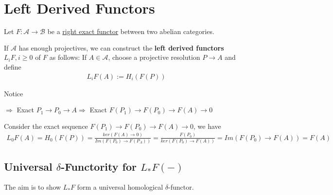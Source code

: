\documentclass[Total.tex]{subfiles}
\begin{document}
		\section{Left Derived Functors}
			\begin{Def}
				Let $F:\mathcal{A}\rightarrow \mathcal{B}$ be a \underline{right exact functor} between two abelian categories. 
				
				
				If $\mathcal{A}$ has enough projectives, we can construct the \textbf{left derived functors} $L_iF,i\geq 0$ of $F$ as follows: If $A\in \mathcal{A}$, choose a projective resolution $P\rightarrow A$ and define
				\begin{gather*}
					L_iF(A):=H_i(F(P))
				\end{gather*}
			\end{Def}
			
			Notice
			
			\begin{center}
				$\Rightarrow$ Exact $ P_1\rightarrow P_0\rightarrow A\Rightarrow$ Exact $ F(P_1)\rightarrow F(P_0)\rightarrow F(A)\rightarrow 0$
			\end{center}
			
			Consider the exact sequence $F(P_1)\rightarrow F(P_0)\rightarrow F(A)\rightarrow 0$, we have
			\begin{gather*}
				L_0F(A)=H_0(F(P))=\frac{ker(F(A)\rightarrow 0)}{Im(F(P_0)\rightarrow F(P_A))}=\frac{F(P_0)}{ker(F(P_0)\rightarrow F(A))}=Im(F(P_0)\rightarrow F(A))=F(A)
			\end{gather*}
			\subsection{Universal $\delta$-Functority for $L_*F(-)$}
			The aim is to show $L_*F$ form a universal homological $\delta$-functor. 
			
\end{document}
